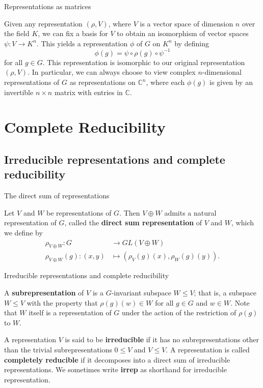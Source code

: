 \begin{frame}{Representations as matrices}
\begin{example}
Given any representation $(\rho, V)$, where $V$ is a vector space of dimension $n$ over the field $K$, we can fix a basis for $V$ to obtain an isomorphism of vector spaces $\psi \colon V \to K^n$.  This yields a representation $\phi$ of $G$ on $K^n$ by defining \[\phi (g) = \psi \circ \rho(g) \circ \psi^{-1}\] for all $g \in G$. This representation is isomorphic to our original representation $(\rho, V)$. In particular, we can always choose to view complex $n$-dimensional representations of $G$ as representations on $\mathbb{C}^n$, where each $\phi(g)$ is given by an invertible $n \times n$ matrix with entries in $\mathbb{C}$.
\end{example}
\end{frame}


\section{Complete Reducibility}
\subsection{Irreducible representations and complete reducibility}
\begin{frame}{The direct sum of representations}
\begin{definition}
Let $V$ and $W$ be representations of $G$.  Then $V \oplus W$ admits a  natural representation of $G$, called the \textbf{direct sum representation} of $V$ and $W$, which we define by 
\begin{align*}
\rho_{V \oplus W} \colon G &\to GL(V \oplus W) \\
\rho_{V \oplus W}(g) \colon (x,y) &\mapsto (\rho_{V} (g)(x), \rho_{W}(g)(y)).
\end{align*}
\end{definition}
\end{frame}

\begin{frame}{Irreducible representations and complete reducibility}
\begin{definition} A \textbf{subrepresentation} of $V$ is a $G$-invariant subspace $W \leq V$; that is, a subspace $W \leq V$ with the property that $\rho(g) (w) \in W$ for all $g \in G$ and $w \in W$.  Note that $W$ itself is a representation of $G$ under the action of the restriction of $\rho(g)$ to $W$.
\end{definition}
\pause
\begin{definition}
A representation $V$ is said to be \textbf{irreducible} if it has no subrepresentations other than the trivial subrepresentations $ 0 \leq V$ and $V \leq V$.  A representation is called \textbf{completely reducible} if it decomposes into a direct sum of irreducible representations.  We sometimes write \textbf{irrep} as shorthand for irreducible representation.
\end{definition}
\end{frame}


